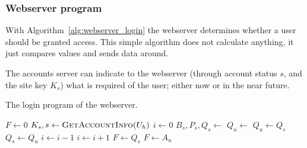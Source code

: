 \subsubsection{Webserver program}
With Algorithm~\vref{alg:webserver_login} the webserver determines whether a user should be granted access.
This simple algorithm does not calculate anything,
it just compares values and sends data around.
\par
The accounts server can indicate to the webserver
(through account status $s$,
and the site key $K_s$)
what is required of the user;
either now or in the near future.
\begin{algorithm}
\caption{The login program of the webserver.}
\label{alg:webserver_login}
\begin{algorithmic}[1]
\State $F\gets 0$ 
\State $K_s,s\gets\Call{GetAccountInfo}{U_h}$ 
\State $i\gets 0$
\Repeat
\State $B_s,P_s,Q_s\gets$ 
\State $Q_u\gets$
\Else{}
\State $Q_u\gets Q_s$
\EndIf
{}
\State $Q_s\gets Q_u$
\EndIf
{} 
\State $i\gets i-1$ 
\Else {}
\State $i\gets i+1$ 
\EndIf
{}
\State $F\gets Q_s$ 
 
\State $F\gets A_u$ 
\EndIf
\EndIf
\State {} 
\EndProcedure
\end{algorithmic}
\end{algorithm}
